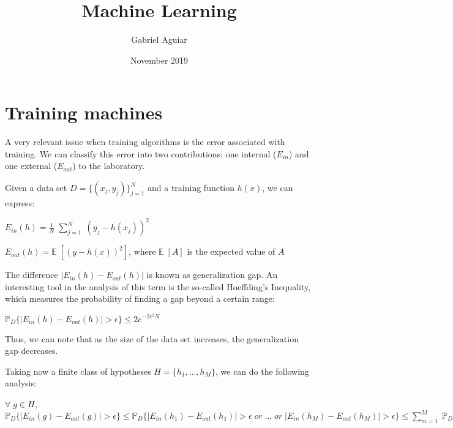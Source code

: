 \documentclass{article}
\title{Machine Learning}
\author{Gabriel Aguiar}
\date{November 2019}
\begin{document}
\maketitle

\section{Training machines}

\hfill

A very relevant issue when training algorithms is the error associated with training. We can classify this error into two contributions: one internal ($E_{in}$) and one external ($E_{out}$) to the laboratory.

\hfill

Given a data set $D = \{ (x_{j}, y_{j}) \}_{j = 1}^{N}$ and a training function $h(x)$, we can express:

\hfill

$E_{in} (h) = \frac{1}{N} \; \sum\limits_{j = 1}^{N} \; (y_{j} - h(x_{j}))^{2}$

\hfill

$E_{out} (h) = \mathbb{E} \; [(y - h(x))^{2}]$, where $\mathbb{E} \; [A]$ is the expected value of $A$

\hfill

The difference $|E_{in} (h) - E_{out} (h)|$ is known as generalization gap. An interesting tool in the analysis of this term is the so-called Hoeffding's Inequality, which measures the probability of finding a gap beyond a certain range:

\hfill

$\mathbb{P}_D \{ |E_{in} (h) - E_{out} (h)| > \epsilon \} \leq 2 e^{-2 \epsilon^{2} N}$

\hfill

Thus, we can note that as the size of the data set increases, the generalization gap decreases.

\hfill

Taking now a finite class of hypotheses $H = \{ h_{1}, ... , h_{M} \}$, we can do the following analysis:

\hfill

$\forall \; g \in H$, $\mathbb{P}_{D} \{ |E_{in} (g) - E_{out} (g)| > \epsilon \} \leq \mathbb{P}_{D} \{ |E_{in} (h_{1}) - E_{out} (h_{1})| > \epsilon \; or \; ... \; or \; |E_{in} (h_{M}) - E_{out} (h_{M})| > \epsilon \} \leq \sum\limits_{m = 1}^{M} \; \mathbb{P}_{D} \{ |E_{in} (h_{m}) - E_{out} (h_{m})| > \epsilon \} \leq 2 M e^{-2 \epsilon^{2} N}$
\end{document}
